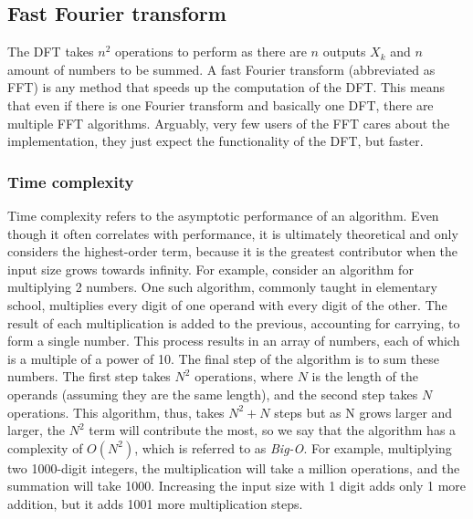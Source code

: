 \subsection{Fast Fourier transform}
The DFT takes $n^2$ operations to perform as there are $n$ outputs $X_k$ and $n$ amount of numbers to be summed. A fast Fourier transform (abbreviated as FFT) is any method that speeds up the computation of the DFT. This means that even if there is one Fourier transform and basically one DFT, there are multiple FFT algorithms. Arguably, very few users of the FFT cares about the implementation, they just expect the functionality of the DFT, but faster. 

\subsubsection{Time complexity}
Time complexity refers to the asymptotic performance of an algorithm. Even though it often correlates with performance, it is ultimately theoretical and only considers the highest-order term, because it is the greatest contributor when the input size grows towards infinity. For example, consider an algorithm for multiplying 2 numbers. One such algorithm, commonly taught in elementary school, multiplies every digit of one operand with every digit of the other. The result of each multiplication is added to the previous, accounting for carrying, to form a single number. This process results in an array of numbers, each of which is a multiple of a power of 10. The final step of the algorithm is to sum these numbers. The first step takes $N^2$ operations, where $N$ is the length of the operands (assuming they are the same length), and the second step takes $N$ operations. This algorithm, thus, takes $N^2+N$ steps but as N grows larger and larger, the $N^2$ term will contribute the most, so we say that the algorithm has a complexity of $O(N^2)$, which is referred to as \textit{Big-O}. For example, multiplying two 1000-digit integers, the multiplication will take a million operations, and the summation will take 1000. Increasing the input size with 1 digit adds only 1 more addition, but it adds 1001 more multiplication steps.

